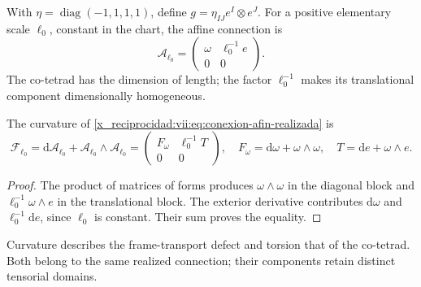With \(\eta=\operatorname{diag}(-1,1,1,1)\), define
\(g=\eta_{IJ}e^I\otimes e^J\). For a positive elementary scale
\(\ell_0\), constant in the chart, the affine connection is
\begin{equation}
 \mathcal A_{\ell_0}
 =\begin{pmatrix}\omega&\ell_0^{-1}e\\0&0\end{pmatrix}.
 \label{x_reciprocidad:vii:eq:conexion-afin-realizada}
\end{equation}
The co-tetrad has the dimension of length; the factor
\(\ell_0^{-1}\) makes its translational component dimensionally homogeneous.

\begin{proposition}
\label{x_reciprocidad:vii:prop:curvatura-afin}
The curvature of \eqref{x_reciprocidad:vii:eq:conexion-afin-realizada} is
\begin{equation}
 \mathcal F_{\ell_0}
 =\mathrm d\mathcal A_{\ell_0}
   +\mathcal A_{\ell_0}\wedge\mathcal A_{\ell_0}
 =\begin{pmatrix}F_\omega&\ell_0^{-1}T\\0&0\end{pmatrix},
 \quad F_\omega=\mathrm d\omega+\omega\wedge\omega,
 \quad T=\mathrm de+\omega\wedge e.
 \label{x_reciprocidad:vii:eq:curvatura-afin-realizada}
\end{equation}
\end{proposition}
\begin{proof}
The product of matrices of forms produces
\(\omega\wedge\omega\) in the diagonal block and
\(\ell_0^{-1}\omega\wedge e\) in the translational block.
The exterior derivative contributes
\(\mathrm d\omega\) and \(\ell_0^{-1}\mathrm de\), since
\(\ell_0\) is constant. Their sum proves the equality.
\end{proof}

Curvature describes the frame-transport defect and torsion
that of the co-tetrad. Both belong to the same realized connection;
their components retain distinct tensorial domains.

